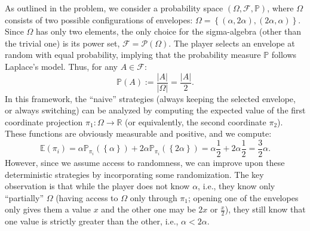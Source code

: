 \begin{solution}
    As outlined in the problem, we consider a probability space \( \left(\Omega,\mathcal{F},\mathbb{P}\right) \), where \( \Omega \) consists of two possible configurations of envelopes: \( \Omega = \left\{\left(\alpha, 2\alpha\right), \left(2\alpha, \alpha\right)\right\} \). Since \( \Omega \) has only two elements, the only choice for the sigma-algebra (other than the trivial one) is its power set, \( \mathcal{F} = \mathscr{P}\left(\Omega\right) \). The player selects an envelope at random with equal probability, implying that the probability measure \( \mathbb{P} \) follows Laplace's model. Thus, for any \( A \in \mathcal{F} \):
    \[
        \mathbb{P}\left(A\right) := \frac{\left|A\right|}{\left|\Omega\right|} = \frac{\left|A\right|}{2}.
    \]
    In this framework, the ``naive'' strategies (always keeping the selected envelope, or always switching) can be analyzed by computing the expected value of the first coordinate projection \( \pi_1:\Omega\rightarrow\mathbb{R} \) (or equivalently, the second coordinate \( \pi_2 \)). These functions are obviously measurable and positive, and we compute:
    \[
        \mathbb{E}\left(\pi_i\right)=\alpha\mathbb{P}_{\pi_i}\left(\left\{\alpha\right\}\right)+2\alpha\mathbb{P}_{\pi_i}\left(\left\{2\alpha\right\}\right)=\alpha\frac{1}{2}+2\alpha\frac{1}{2}=\frac{3}{2}\alpha.
    \]
    However, since we assume access to randomness, we can improve upon these deterministic strategies by incorporating some randomization. The key observation is that while the player does not know \( \alpha \), i.e., they know only ``partially'' \( \Omega \) (having access to \( \Omega \) only through \( \pi_1 \); opening one of the envelopes only gives them a value \( x \) and the other one may be \( 2x \) or \( \frac{x}{2} \)), they still know that one value is strictly greater than the other, i.e., \( \alpha < 2\alpha \). \\

\end{solution}
